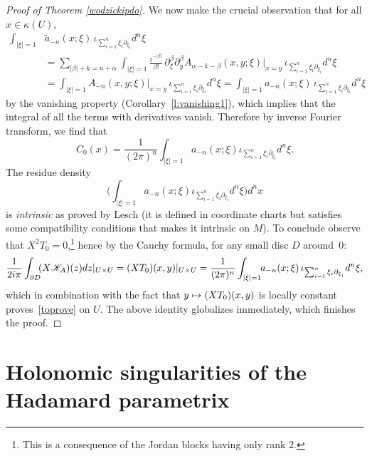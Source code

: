 \documentclass[10pt]{amsart}
\let\pazocal\mathscr
\def\mto{\mathchoice{\longmapsto}{\mapsto}{\mapsto}{\mapsto}}
\theoremstyle{definition}
\newenvironment{refproof}[1]{\begin{proof}[Proof of {#1}]}{\end{proof}}
\let\cv\alpha
\let\asigma a
\let\euler X
\begin{document}
\begin{refproof}{Theorem \ref{wodzickipdo}}
We now make the crucial observation that for all $x\in \kappa(U)$,
\[
\begin{aligned}
\int_{\vert \xi\vert=1} &\tilde{\asigma}_{-n}(x;\xi) \,\iota_{\sum_{i=1}^n\xi_i\partial_{\xi_i}} d^n\xi
\\ &=
\sum_{\vert \beta\vert+k={n+\cv} }
\int_{\vert \xi\vert=1} \frac{i^{-\vert \beta\vert}}{\beta !}\,\partial_\xi^\beta \partial_y^\beta A_{\cv-k-\beta}(x,y;\xi) |_{x=y} \,\iota_{\sum_{i=1}^n\xi_i\partial_{\xi_i}} d^n\xi \\
&=\int_{\vert \xi\vert=1} A_{-n}(x,y;\xi) |_{x=y} \,\iota_{\sum_{i=1}^n\xi_i\partial_{\xi_i}} d^n\xi=\int_{\vert \xi\vert=1} \asigma_{-n}(x;\xi) \,\iota_{\sum_{i=1}^n\xi_i\partial_{\xi_i}} d^n\xi
\end{aligned}
\]
by the vanishing property ({Corollary}~\ref{l:vanishing1}), which implies that the integral of
all the terms with derivatives vanish.
Therefore by inverse Fourier transform, we find that
\begin{equation*}
C_0(x)=\frac{1}{(2\pi)^n}\int_{\vert \xi\vert=1} \asigma_{-n}(x;\xi) \iota_{\sum_{i=1}^n\xi_i\partial_{\xi_i}} d^n\xi.
\end{equation*}
The residue density
\[
\biggl(\int_{\vert \xi\vert=1} \asigma_{-n}(x;\xi)\iota_{\sum_{i=1}^n\xi_i\partial_{\xi_i}} d^n\xi\biggr) {d^nx}
\]
is \emph{intrinsic} as proved by Lesch \cite[Prop.\,4.5]{Lesch} (it is defined in coordinate charts but satisfies some compatibility conditions that makes it intrinsic on $M$).
To conclude observe that $\euler^2T_0=0$,\footnote{This is a consequence of the Jordan blocks having only rank $2$.} hence by the Cauchy formula, for any small disc $D$ around~$0$:
\[
\frac{1}{2i\pi}\int_{\partial D}\hspace*{-1mm}(\euler \pazocal{K}_A)(z) dz|_{U\times U}={\left(\euler T_0\right)}(x,y)|_{U\times U}=\frac{1}{(2\pi)^n}\int_{\vert \xi\vert=1}\hspace*{-1mm} \asigma_{-n}(x;\xi) \,\iota_{\sum_{i=1}^n\xi_i\partial_{\xi_i}} d^n\xi,
\]
which in combination with the fact that $y\mto{\left(\euler T_0\right)}(x,y)$ is locally constant proves~\eqref{toprove} on $U$. The above identity globalizes immediately, which finishes the proof.
\end{refproof}

\section{Holonomic singularities of the Hadamard parametrix}
\label{section4}
\end{document}
